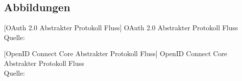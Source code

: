 \subsection{Abbildungen}\label{subsec:abbildungen}

	\bigskip\noindent
	\begin{minipage}{\textwidth}
		\centering
		\label{fig:soapKommunikation}
		
	\end{minipage}

	\bigskip\noindent
	\begin{minipage}{\textwidth}
		\centering
		\label{fig:restKommunikation}
		
	\end{minipage}

	\bigskip\noindent
	\begin{minipage}{\textwidth}
		\centering
		\label{fig:schichtenmodell}
		
	\end{minipage}

	\bigskip\noindent
	\begin{minipage}{\textwidth}
		\centering
		[OAuth 2.0 Abstrakter Protokoll Fluss]
		{OAuth 2.0 Abstrakter Protokoll Fluss\\Quelle:~}
		\label{fig:oauthAbstractFlow}
		
	\end{minipage}

	\bigskip\noindent
	\begin{minipage}{\textwidth}
		\centering
		[OpenID Connect Core Abstrakter Protokoll Fluss]
		{OpenID Connect Core Abstrakter Protokoll Fluss\\Quelle:~}
		\label{fig:openIDAbstractFlow}
		
	\end{minipage}